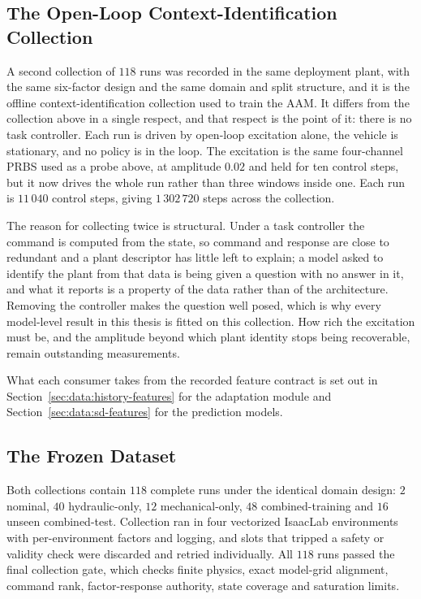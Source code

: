 \subsection{The Open-Loop Context-Identification Collection}
\label{sec:data:openloop-collection}

A second collection of $118$ runs was recorded in the same deployment plant,
with the same six-factor design and the same domain and split structure, and it
is the offline context-identification collection used to train the AAM. It
differs from the collection
above in a single respect, and that respect is the point of it: there is no task
controller. Each run is driven by open-loop excitation alone, the vehicle is
stationary, and no policy is in the loop. The excitation is the same
four-channel PRBS used as a probe above, at amplitude $0.02$ and held for ten
control steps, but it now drives the whole run rather than three windows inside
one. Each run is $11\,040$ control steps, giving $1\,302\,720$ steps across the
collection.

The reason for collecting twice is structural. Under a task controller the
command is computed from the state, so command and response are close to
redundant and a plant descriptor has little left to explain; a model asked to
identify the plant from that data is being given a question with no answer in
it, and what it reports is a property of the data rather than of the
architecture. Removing the controller makes the question well posed, which is
why every model-level result in this thesis is fitted on this collection. How
rich the excitation must be, and the amplitude beyond which plant identity stops
being recoverable, remain outstanding measurements.

What each consumer takes from the recorded feature contract is set out in
Section~\ref{sec:data:history-features} for the adaptation module and
Section~\ref{sec:data:sd-features} for the prediction models.

\subsection{The Frozen Dataset}

Both collections contain $118$ complete runs under the identical domain design:
$2$ nominal, $40$ hydraulic-only, $12$ mechanical-only, $48$ combined-training
and $16$ unseen combined-test. Collection ran in four vectorized IsaacLab
environments with per-environment factors and logging, and slots that tripped a
safety or validity check were discarded and retried individually. All $118$ runs
passed the final collection gate, which checks finite physics, exact model-grid
alignment, command rank, factor-response authority, state coverage and
saturation limits.

